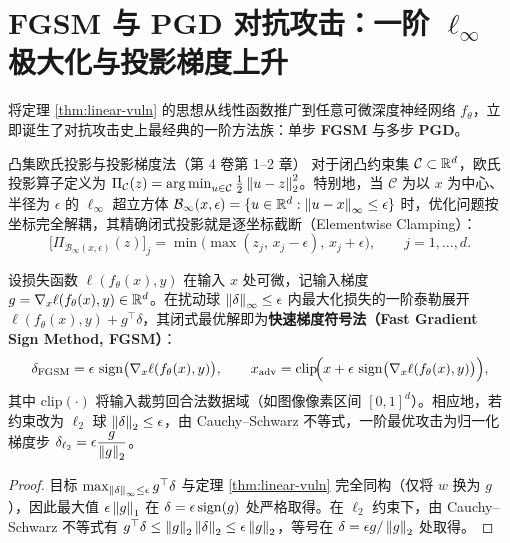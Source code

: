 \section{FGSM 与 PGD 对抗攻击：一阶 $\ell_\infty$ 极大化与投影梯度上升}

将定理 \ref{thm:linear-vuln} 的思想从线性函数推广到任意可微深度神经网络 $f_\theta$，立即诞生了对抗攻击史上最经典的一阶方法族：单步 \textbf{FGSM} 与多步 \textbf{PGD}。

\begin{recallBox}{凸集欧氏投影与投影梯度法（第 4 卷第 1--2 章）}
对于闭凸约束集 $\mathcal{C} \subset \mathbb{R}^d$，欧氏投影算子定义为 $\Pi_{\mathcal{C}}(z) = \operatorname*{arg\,min}_{u \in \mathcal{C}} \frac{1}{2}\left\|u - z\right\|_2^2$。特别地，当 $\mathcal{C}$ 为以 $x$ 为中心、半径为 $\epsilon$ 的 $\ell_\infty$ 超立方体 $\mathcal{B}_\infty(x, \epsilon) = \{u \in \mathbb{R}^d : \left\|u - x\right\|_\infty \le \epsilon\}$ 时，优化问题按坐标完全解耦，其精确闭式投影就是逐坐标截断（Elementwise Clamping）：
\[
  \big[\Pi_{\mathcal{B}_\infty(x,\epsilon)}(z)\big]_j = \min\!\big(\max(z_j,\, x_j - \epsilon),\, x_j + \epsilon\big), \qquad j = 1,\dots,d.
\]
\end{recallBox}

\begin{thmBox}
\begin{proposition}\label{prop:fgsm}
设损失函数 $\ell(f_\theta(x), y)$ 在输入 $x$ 处可微，记输入梯度 $g = \nabla_x \ell(f_\theta(x), y) \in \mathbb{R}^d$。在扰动球 $\left\|\delta\right\|_\infty \le \epsilon$ 内最大化损失的一阶泰勒展开 $\ell(f_\theta(x), y) + g^\top \delta$，其闭式最优解即为\textbf{快速梯度符号法（Fast Gradient Sign Method, FGSM）}：
\begin{equation}\label{eq:fgsm}
  \delta_{\mathrm{FGSM}} = \epsilon\,\operatorname{sign}\!\big(\nabla_x \ell(f_\theta(x), y)\big),
  \qquad
  x_{\mathrm{adv}} = \mathrm{clip}\!\Big(x + \epsilon\,\operatorname{sign}\!\big(\nabla_x \ell(f_\theta(x), y)\big)\Big),
\end{equation}
其中 $\mathrm{clip}(\cdot)$ 将输入裁剪回合法数据域（如图像像素区间 $[0,1]^d$）。相应地，若约束改为 $\ell_2$ 球 $\left\|\delta\right\|_2 \le \epsilon$，由 Cauchy--Schwarz 不等式，一阶最优攻击为归一化梯度步 $\delta_{\ell_2} = \epsilon \dfrac{g}{\left\|g\right\|_2}$。
\end{proposition}
\end{thmBox}

\begin{proof}
目标 $\max_{\left\|\delta\right\|_\infty \le \epsilon} g^\top \delta$ 与定理 \ref{thm:linear-vuln} 完全同构（仅将 $w$ 换为 $g$），因此最大值 $\epsilon\left\|g\right\|_1$ 在 $\delta = \epsilon\operatorname{sign}(g)$ 处严格取得。在 $\ell_2$ 约束下，由 Cauchy--Schwarz 不等式有 $g^\top \delta \le \left\|g\right\|_2 \left\|\delta\right\|_2 \le \epsilon\left\|g\right\|_2$，等号在 $\delta = \epsilon g / \left\|g\right\|_2$ 处取得。
\end{proof}

